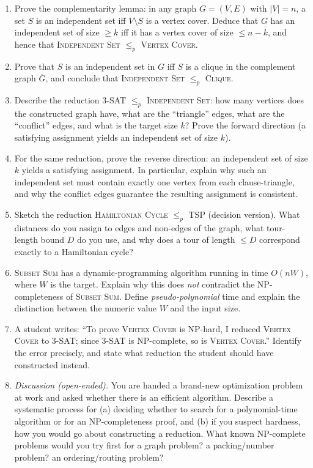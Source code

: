 \documentclass[11pt]{article}
\begin{document}
\begin{enumerate}[label=\textbf{A\arabic*.}, leftmargin=2.2em]
\item Prove the complementarity lemma: in any graph $G = (V, E)$ with $|V| = n$, a set $S$
is an independent set iff $V \setminus S$ is a vertex cover. Deduce that $G$ has an
independent set of size $\ge k$ iff it has a vertex cover of size $\le n - k$, and hence
that \textsc{Independent Set} $\le_p$ \textsc{Vertex Cover}.

\item Prove that $S$ is an independent set in $G$ iff $S$ is a clique in the complement
graph $\overline{G}$, and conclude that \textsc{Independent Set} $\le_p$ \textsc{Clique}.

\item Describe the reduction \textsc{3-SAT} $\le_p$ \textsc{Independent Set}: how many
vertices does the constructed graph have, what are the ``triangle'' edges, what are the
``conflict'' edges, and what is the target size $k$? Prove the forward direction (a
satisfying assignment yields an independent set of size $k$).

\item For the same reduction, prove the reverse direction: an independent set of size $k$
yields a satisfying assignment. In particular, explain why such an independent set must
contain exactly one vertex from each clause-triangle, and why the conflict edges guarantee
the resulting assignment is consistent.

\item Sketch the reduction \textsc{Hamiltonian Cycle} $\le_p$ \textsc{TSP} (decision
version). What distances do you assign to edges and non-edges of the graph, what tour-length
bound $D$ do you use, and why does a tour of length $\le D$ correspond exactly to a
Hamiltonian cycle?

\item \textsc{Subset Sum} has a dynamic-programming algorithm running in time $O(nW)$, where
$W$ is the target. Explain why this does \emph{not} contradict the NP-completeness of
\textsc{Subset Sum}. Define \emph{pseudo-polynomial} time and explain the distinction
between the numeric value $W$ and the input size.

\item A student writes: ``To prove \textsc{Vertex Cover} is NP-hard, I reduced
\textsc{Vertex Cover} to \textsc{3-SAT}; since \textsc{3-SAT} is NP-complete, so is
\textsc{Vertex Cover}.'' Identify the error precisely, and state what reduction the student
should have constructed instead.

\item \emph{Discussion (open-ended).} You are handed a brand-new optimization problem at
work and asked whether there is an efficient algorithm. Describe a systematic process for
(a) deciding whether to search for a polynomial-time algorithm or for an NP-completeness
proof, and (b) if you suspect hardness, how you would go about constructing a reduction.
What known NP-complete problems would you try first for a graph problem? a packing/number
problem? an ordering/routing problem?

\end{enumerate}
\end{document}
